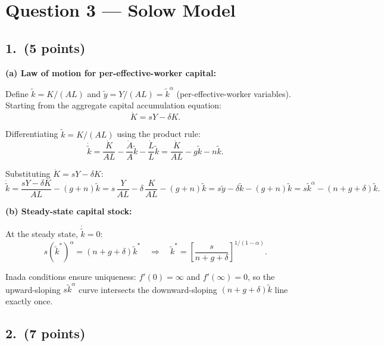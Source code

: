 \documentclass[a4paper,11pt]{article}
\newcommand{\ktilde}{\tilde{k}}
\newcommand{\ytilde}{\tilde{y}}
\begin{document}
\clearpage

\section{Question 3 --- Solow Model}

\subsection*{1.\ (5 points)}

\begin{answerbox}
\textbf{(a) Law of motion for per-effective-worker capital:}

Define $\ktilde = K/(AL)$ and $\ytilde = Y/(AL) = \ktilde^\alpha$ (per-effective-worker variables).  Starting from the aggregate capital accumulation equation:
\[
    \dot{K} = sY - \delta K.
\]

Differentiating $\ktilde = K/(AL)$ using the product rule:
\[
    \dot{\ktilde} = \frac{\dot{K}}{AL} - \frac{\dot{A}}{A}\ktilde - \frac{\dot{L}}{L}\ktilde
    = \frac{\dot{K}}{AL} - g\ktilde - n\ktilde.
\]

Substituting $\dot{K} = sY - \delta K$:
\[
    \dot{\ktilde} = \frac{sY - \delta K}{AL} - (g+n)\ktilde
    = s\,\frac{Y}{AL} - \delta\,\frac{K}{AL} - (g+n)\ktilde
    = s\ytilde - \delta\ktilde - (g+n)\ktilde
    = \boxed{s\ktilde^\alpha - (n+g+\delta)\ktilde.}
\]

\textbf{(b) Steady-state capital stock:}

At the steady state, $\dot{\ktilde} = 0$:
\[
    s(\ktilde^*)^\alpha = (n+g+\delta)\ktilde^*
    \quad\Longrightarrow\quad
    \boxed{\ktilde^* = \left[\frac{s}{n+g+\delta}\right]^{1/(1-\alpha)}.}
\]

Inada conditions ensure uniqueness: $f'(0) = \infty$ and $f'(\infty) = 0$, so the upward-sloping $s\ktilde^\alpha$ curve intersects the downward-sloping $(n+g+\delta)\ktilde$ line exactly once.
\end{answerbox}

\subsection*{2.\ (7 points)}
\end{document}
